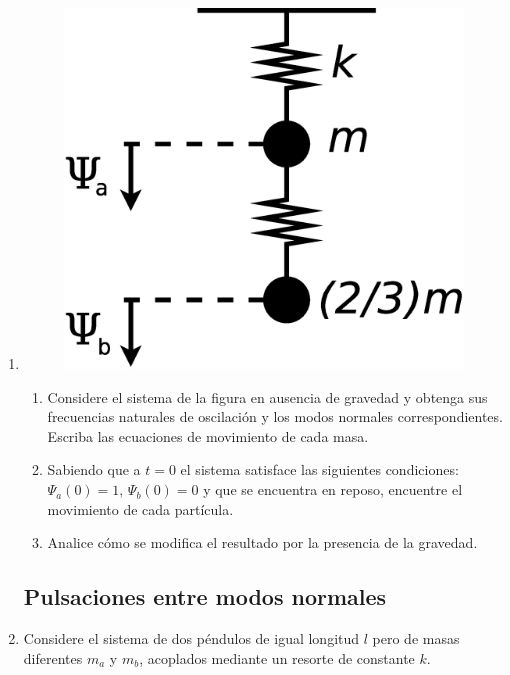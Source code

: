 \documentclass[11pt,spanish,a4paper]{article}
\begin{document}
\begin{enumerate}
\item %
\begin{figure}[H]
\centering{}\includegraphics[clip,scale=0.25]{ej1-6}
\end{figure}
\begin{enumerate}
\item Considere el sistema de la figura en ausencia de gravedad y obtenga sus frecuencias naturales de oscilación y los modos normales correspondientes.
Escriba las ecuaciones de movimiento de cada masa.
\item Sabiendo que a $t=0$ el sistema satisface las siguientes condiciones: $\Psi_{a}(0)=1,\,\Psi_{b}(0)=0$ y que se encuentra en reposo, encuentre el movimiento de cada partícula.
\item Analice cómo se modifica el resultado por la presencia de la gravedad.
\end{enumerate}



\subsection*{Pulsaciones entre modos normales}

\item Considere el sistema de dos péndulos de igual longitud $l$ pero de masas diferentes $m_{a}$ y $m_{b}$, acoplados mediante un resorte
de constante $k$.


\end{enumerate}
\end{document}
